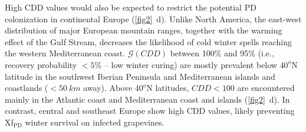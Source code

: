     High CDD values would also be expected to restrict the potential PD
    colonization in continental Europe (\cref{fig2}~\textcolor{ref_color}{d}).
    Unlike North America,
    the east-west distribution of major European mountain ranges, together with
    the warming effect of the Gulf Stream, decreases the likelihood of cold
    winter spells reaching the western Mediterranean coast. $\mathcal{G}(CDD)$
    between 100\% and 95\% (i.e., recovery probability $<5\%$ -- low winter
    curing) are mostly prevalent below $40^o$N latitude in the southwest
    Iberian Peninsula and Mediterranean islands and coastlands ($<\SI{50}{km}$
    away). Above $40^o$N latitudes, $CDD < 100$ are encountered mainly in the
    Atlantic coast and Mediterranean coast and islands
    (\cref{fig2}~\textcolor{ref_color}{d}). In
    contrast, central and southeast Europe show high CDD values, likely
    preventing Xf$_{\textrm{PD}}$ winter survival on infected grapevines.

